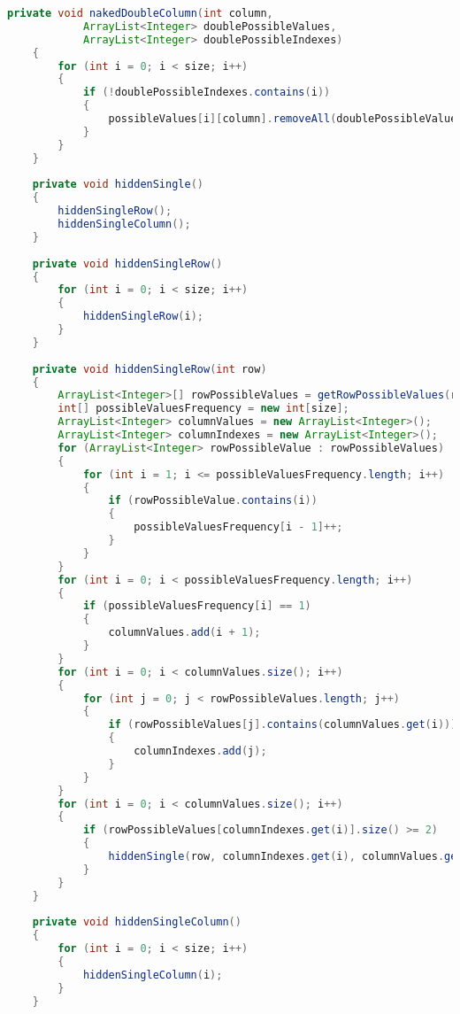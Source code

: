 \begin{lstlisting}[language=Java,basicstyle=\tiny,caption=SolverRuleBased.java]
    private void nakedDoubleColumn(int column,
            ArrayList<Integer> doublePossibleValues, 
            ArrayList<Integer> doublePossibleIndexes)
    {
        for (int i = 0; i < size; i++)
        {
            if (!doublePossibleIndexes.contains(i))
            {
                possibleValues[i][column].removeAll(doublePossibleValues);
            }
        }
    }
    
    private void hiddenSingle()
    {
        hiddenSingleRow();
        hiddenSingleColumn();
    }
    
    private void hiddenSingleRow()
    {
        for (int i = 0; i < size; i++)
        {
            hiddenSingleRow(i);
        }
    }
    
    private void hiddenSingleRow(int row)
    {
        ArrayList<Integer>[] rowPossibleValues = getRowPossibleValues(row);
        int[] possibleValuesFrequency = new int[size];
        ArrayList<Integer> columnValues = new ArrayList<Integer>();
        ArrayList<Integer> columnIndexes = new ArrayList<Integer>();
        for (ArrayList<Integer> rowPossibleValue : rowPossibleValues)
        {
            for (int i = 1; i <= possibleValuesFrequency.length; i++)
            {
                if (rowPossibleValue.contains(i))
                {
                    possibleValuesFrequency[i - 1]++;
                }
            }
        }
        for (int i = 0; i < possibleValuesFrequency.length; i++)
        {
            if (possibleValuesFrequency[i] == 1)
            {
                columnValues.add(i + 1);
            }
        }
        for (int i = 0; i < columnValues.size(); i++)
        {
            for (int j = 0; j < rowPossibleValues.length; j++)
            {
                if (rowPossibleValues[j].contains(columnValues.get(i)))
                {
                    columnIndexes.add(j);
                }
            }
        }
        for (int i = 0; i < columnValues.size(); i++)
        {
            if (rowPossibleValues[columnIndexes.get(i)].size() >= 2)
            {
                hiddenSingle(row, columnIndexes.get(i), columnValues.get(i));
            }
        }
    }
    
    private void hiddenSingleColumn()
    {
        for (int i = 0; i < size; i++)
        {
            hiddenSingleColumn(i);
        }
    }
    

\end{lstlisting}
